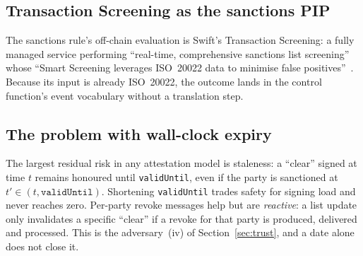 \documentclass[11pt,a4paper]{article}
\begin{document}
\subsection{Transaction Screening as the sanctions PIP}
The sanctions rule's off-chain evaluation is Swift's Transaction Screening: a
fully managed service performing ``real-time, comprehensive sanctions list
screening'' whose ``Smart Screening leverages ISO~20022 data to minimise false
positives''~\cite{swifttxnscreen}. Because its input is already ISO~20022, the
outcome lands in the control function's event vocabulary without a translation
step.

\subsection{The problem with wall-clock expiry}
The largest residual risk in any attestation model is staleness: a ``clear''
signed at time $t$ remains honoured until \texttt{validUntil}, even if the party
is sanctioned at $t' \in (t, \texttt{validUntil})$. Shortening \texttt{validUntil}
trades safety for signing load and never reaches zero. Per-party revoke messages
help but are \emph{reactive}: a list update only invalidates a specific ``clear''
if a revoke for that party is produced, delivered and processed. This is the
adversary~(iv) of Section~\ref{sec:trust}, and a date alone does not close it.
\end{document}
